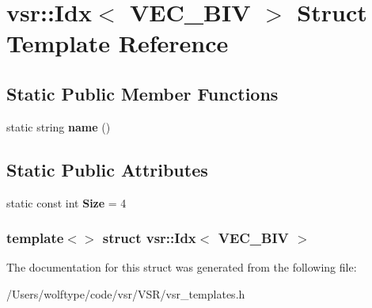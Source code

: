 \hypertarget{structvsr_1_1_idx_3_01_v_e_c___b_i_v_01_4}{\section{vsr\-:\-:Idx$<$ V\-E\-C\-\_\-\-B\-I\-V $>$ Struct Template Reference}
\label{structvsr_1_1_idx_3_01_v_e_c___b_i_v_01_4}
}
\subsection*{Static Public Member Functions}
\begin{DoxyCompactItemize}
\item 
\hypertarget{structvsr_1_1_idx_3_01_v_e_c___b_i_v_01_4_ab954d82b32b5f75ef367f5782d9ff7d5}{static string {\bfseries name} ()}\label{structvsr_1_1_idx_3_01_v_e_c___b_i_v_01_4_ab954d82b32b5f75ef367f5782d9ff7d5}

\end{DoxyCompactItemize}
\subsection*{Static Public Attributes}
\begin{DoxyCompactItemize}
\item 
\hypertarget{structvsr_1_1_idx_3_01_v_e_c___b_i_v_01_4_a12d0163b5c2dae4d1d95276bb6d2c4fa}{static const int {\bfseries Size} = 4}\label{structvsr_1_1_idx_3_01_v_e_c___b_i_v_01_4_a12d0163b5c2dae4d1d95276bb6d2c4fa}

\end{DoxyCompactItemize}
\subsubsection*{template$<$$>$ struct vsr\-::\-Idx$<$ V\-E\-C\-\_\-\-B\-I\-V $>$}



The documentation for this struct was generated from the following file\-:\begin{DoxyCompactItemize}
\item 
/\-Users/wolftype/code/vsr/\-V\-S\-R/vsr\-\_\-templates.\-h\end{DoxyCompactItemize}

